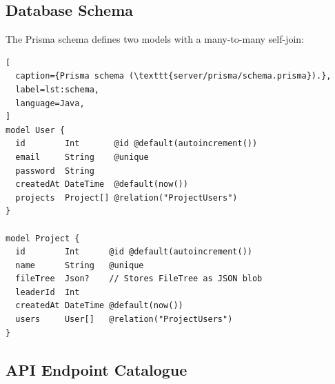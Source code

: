 \subsection{Database Schema}

The Prisma schema defines two models with a many-to-many self-join:

\begin{lstlisting}[
  caption={Prisma schema (\texttt{server/prisma/schema.prisma}).},
  label=lst:schema,
  language=Java,
]
model User {
  id        Int       @id @default(autoincrement())
  email     String    @unique
  password  String
  createdAt DateTime  @default(now())
  projects  Project[] @relation("ProjectUsers")
}

model Project {
  id        Int      @id @default(autoincrement())
  name      String   @unique
  fileTree  Json?    // Stores FileTree as JSON blob
  leaderId  Int
  createdAt DateTime @default(now())
  users     User[]   @relation("ProjectUsers")
}
\end{lstlisting}

\subsection{API Endpoint Catalogue}

